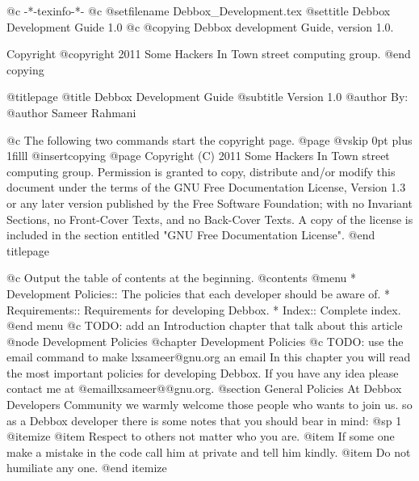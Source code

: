    @c -*-texinfo-*-
@c %
@setfilename Debbox_Development.tex
@settitle Debbox Development Guide 1.0
@c %
@copying
Debbox development Guide, version 1.0.

Copyright @copyright{} 2011 Some Hackers In Town street computing group.
@end copying

@titlepage
@title Debbox Development Guide
@subtitle Version 1.0
@author By:
@author Sameer Rahmani

@c The following two commands start the copyright page.
@page
@vskip 0pt plus 1filll
@insertcopying
@page
Copyright (C)  2011  Some Hackers In Town street computing group.
Permission is granted to copy, distribute and/or modify this document
under the terms of the GNU Free Documentation License, Version 1.3
or any later version published by the Free Software Foundation;
with no Invariant Sections, no Front-Cover Texts, and no Back-Cover Texts.
A copy of the license is included in the section entitled "GNU
Free Documentation License".
@end titlepage

@c Output the table of contents at the beginning.
@contents
@menu
* Development Policies::        The policies that each developer should be aware of.
* Requirements::        Requirements for developing Debbox.
* Index::            Complete index.
@end menu
@c TODO: add an Introduction chapter that talk about this article
@node Development Policies
@chapter Development Policies
@c TODO: use the email command to make lxsameer@gnu.org an email
In this chapter you will read the most important policies for developing Debbox. If you have any idea please contact me at @email{lxsameer@@gnu.org}.
@section General Policies    
At Debbox Developers Community we warmly welcome those people who wants to join us. so
as a Debbox developer there is some notes that you should bear in mind:
@sp 1
@itemize
@item
Respect to others not matter who you are.
@item
If some one make a mistake in the code call him at private and tell him kindly.
@item
Do not humiliate any one.
@end itemize

